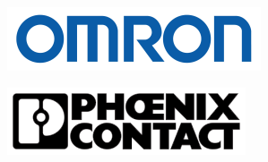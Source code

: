 \begin{figure}[h!]
    \begin{subfigure}[h]{0.15\textheight}
        \includegraphics[width=\textwidth]{images/sponsors/omron}
    \end{subfigure}%
    \hspace{1cm}
    \begin{subfigure}[h]{0.15\textheight}
        \includegraphics[width=\textwidth]{images/sponsors/phoenixContact}
    \end{subfigure}
\vspace{0.4cm}


    \begin{subfigure}[h]{0.15\textheight}


\end{subfigure}
\end{figure}
